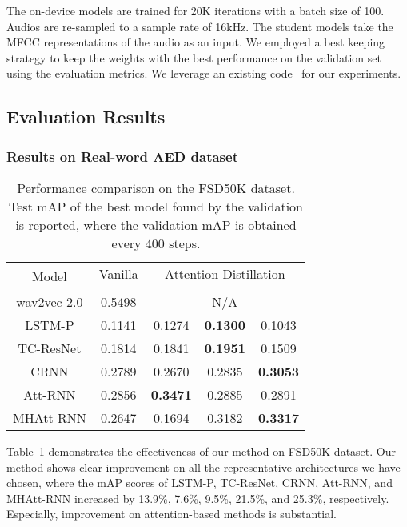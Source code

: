 \documentclass{article}
\begin{document}
The on-device models are trained for 20K iterations with a batch size of 100. 
Audios are re-sampled to a sample rate of 16kHz.
The student models take the MFCC representations of the audio as an input.
We employed a best keeping strategy to keep the weights with the best performance on the validation set using the evaluation metrics.
We leverage an existing code~\cite{Rybakov_2020} for our experiments.

\subsection{Evaluation Results}\label{subsec:3_2_evaluation_results}
\subsubsection{Results on Real-word AED dataset}\label{subsubsec:3_2_1_real_world_dataset}
\begin{table}[t]
\caption{
Performance comparison on the FSD50K dataset.
Test mAP of the best model found by the validation is reported, where the validation mAP is obtained every 400 steps.
}
\vspace{0.5em}
\label{tab:1_evaluation_results_fsd50k}
\scriptsize
\centering
\begin{tabular}{c|c|ccc}
\toprule
\multirow{2}{*}{Model} & Vanilla & \multicolumn{3}{c}{Attention Distillation} \\
 &  &  &  &  \\
\midrule

wav2vec 2.0 & 0.5498 & \multicolumn{3}{c}{ N/A } \\
\cmidrule{1-5}
LSTM-P & 0.1141 & 0.1274 & \textbf{ 0.1300 } & 0.1043 \\
TC-ResNet & 0.1814 & 0.1841 & \textbf{ 0.1951 } & 0.1509 \\
CRNN & 0.2789 & 0.2670 & 0.2835 & \textbf{ 0.3053 } \\
Att-RNN & 0.2856 & \textbf{ 0.3471 } & 0.2885 & 0.2891 \\
MHAtt-RNN & 0.2647 & 0.1694 & 0.3182 & \textbf{ 0.3317 } \\
\bottomrule
\end{tabular}
\vspace{-2em}
\end{table} 
Table~\ref{tab:1_evaluation_results_fsd50k} demonstrates the effectiveness of our method on FSD50K dataset.
Our method shows clear improvement on all the representative architectures we have chosen, where the mAP scores of LSTM-P, TC-ResNet, CRNN, Att-RNN, and MHAtt-RNN increased by 13.9\%, 7.6\%, 9.5\%, 21.5\%, and 25.3\%, respectively.
Especially, improvement on attention-based methods is substantial.
\end{document}
